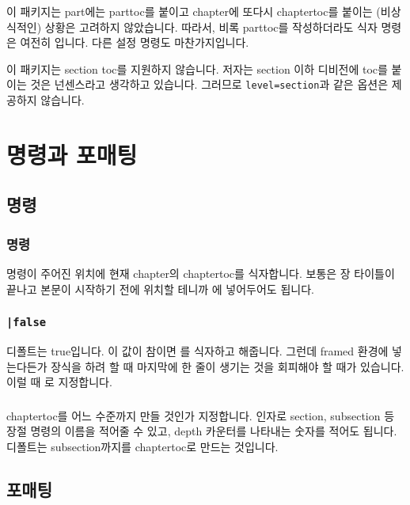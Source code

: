 \documentclass[chapter,a4paper,oneside,colorlinks]{oblivoir}
\begin{document}
이 패키지는 part에는 parttoc를 붙이고 chapter에 또다시 chaptertoc를 붙이는
(비상식적인) 상황은 고려하지 않았습니다. 따라서, 비록 parttoc를 작성하더라도 
식자 명령은 여전히 입니다. 다른 설정 명령도 마찬가지입니다.

이 패키지는 section toc를 지원하지 않습니다. 저자는 section 이하 디비전에 toc를 붙이는 것은
넌센스라고 생각하고 있습니다. 그러므로 \texttt{level=section}과 같은 옵션은
제공하지 않습니다.

\chapter{명령과 포매팅}

\section{명령}

\subsection{ 명령}

명령이 주어진 위치에 현재 chapter의 chaptertoc를 식자합니다. 보통은 장 타이틀이 끝나고 본문이 시작하기 전에 위치할 테니까 에 넣어두어도 됩니다.

\subsection{\texttt{|false}}

디폴트는 true입니다. 이 값이 참이면 를 식자하고 해줍니다. 그런데 framed 환경에 넣는다든가 장식을 하려 할 때 마지막에 한 줄이 생기는 것을 회피해야 할 때가 있습니다. 이럴 때 로 지정합니다.

\subsection{}

chaptertoc를 어느 수준까지 만들 것인가 지정합니다. 인자로 section, subsection 등 장절 명령의 이름을 적어줄 수 있고, depth 카운터를 나타내는 숫자를 적어도 됩니다. 디폴트는 subsection까지를 chaptertoc로 만드는 것입니다. 

\section{포매팅}
\end{document}
